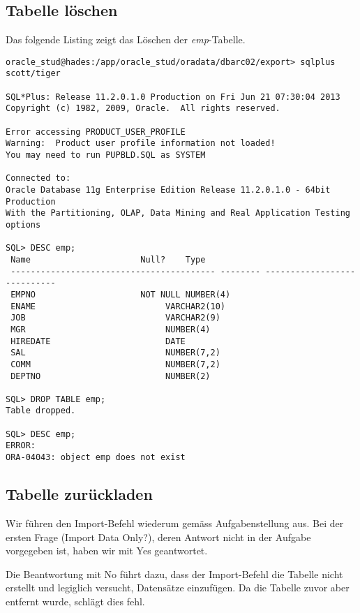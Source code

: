 \documentclass[11pt,a4paper,parskip=half]{scrartcl}
\begin{document}
\subsection{Tabelle löschen}
Das folgende Listing zeigt das Löschen der \emph{emp}-Tabelle.

\begin{lstlisting}
oracle_stud@hades:/app/oracle_stud/oradata/dbarc02/export> sqlplus scott/tiger

SQL*Plus: Release 11.2.0.1.0 Production on Fri Jun 21 07:30:04 2013
Copyright (c) 1982, 2009, Oracle.  All rights reserved.

Error accessing PRODUCT_USER_PROFILE
Warning:  Product user profile information not loaded!
You may need to run PUPBLD.SQL as SYSTEM

Connected to:
Oracle Database 11g Enterprise Edition Release 11.2.0.1.0 - 64bit Production
With the Partitioning, OLAP, Data Mining and Real Application Testing options

SQL> DESC emp;
 Name					   Null?    Type
 ----------------------------------------- -------- ----------------------------
 EMPNO					   NOT NULL NUMBER(4)
 ENAME						    VARCHAR2(10)
 JOB						    VARCHAR2(9)
 MGR						    NUMBER(4)
 HIREDATE					    DATE
 SAL						    NUMBER(7,2)
 COMM						    NUMBER(7,2)
 DEPTNO 					    NUMBER(2)

SQL> DROP TABLE emp;
Table dropped.

SQL> DESC emp;
ERROR:
ORA-04043: object emp does not exist
\end{lstlisting}

\subsection{Tabelle zurückladen}
Wir führen den Import-Befehl wiederum gemäss Aufgabenstellung aus. Bei der ersten Frage (\glqq{}Import Data Only?\grqq{}), deren Antwort nicht in der Aufgabe vorgegeben ist, haben wir mit \glqq{}Yes\grqq{} geantwortet. 

Die Beantwortung mit \glqq{}No\grqq{} führt dazu, dass der Import-Befehl die Tabelle nicht erstellt und legiglich versucht, Datensätze einzufügen. Da die Tabelle zuvor aber entfernt wurde, schlägt dies fehl.
\end{document}
